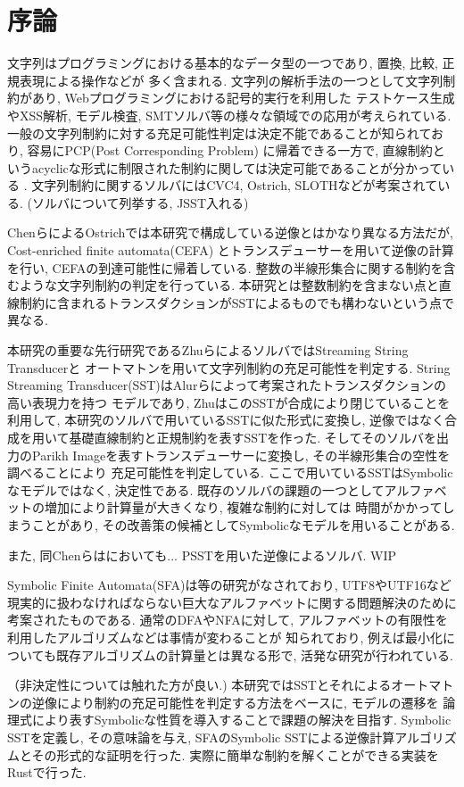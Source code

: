 \documentclass[uplatex,dvipdfmx,a4j]{jsreport}
\begin{document}
  \chapter{序論}  \label{chap:introduction}

  文字列はプログラミングにおける基本的なデータ型の一つであり, 置換, 比較, 正規表現による操作などが
  多く含まれる.
  文字列の解析手法の一つとして文字列制約があり, Webプログラミングにおける記号的実行を利用した
  テストケース生成やXSS解析, モデル検査, SMTソルバ等の様々な領域での応用が考えられている.
  一般の文字列制約に対する充足可能性判定は決定不能であることが知られており, 容易にPCP(Post Corresponding Problem)
  に帰着できる一方で, 直線制約というacyclicな形式に制限された制約に関しては決定可能であることが分かっている
  \cite{lin2016string}.
  文字列制約に関するソルバにはCVC4\cite{barrett2011cvc4},
  Ostrich\cite{chen2020decision}, SLOTH\cite{holik2017string}などが考案されている.
  (ソルバについて列挙する, JSST入れる)

  ChenらによるOstrichでは本研究で構成している逆像とはかなり異なる方法だが,
  Cost-enriched finite automata(CEFA)\cite{alur2013regular}
  とトランスデューサーを用いて逆像の計算を行い, CEFAの到達可能性に帰着している.
  整数の半線形集合に関する制約を含むような文字列制約の判定を行っている.
  本研究とは整数制約を含まない点と直線制約に含まれるトランスダクションがSSTによるものでも構わないという点で異なる.

  本研究の重要な先行研究であるZhuらによるソルバ\cite{zhu2019sstsolver}ではStreaming String Transducerと
  オートマトンを用いて文字列制約の充足可能性を判定する.
  String Streaming Transducer(SST)はAlurらによって考案されたトランスダクションの高い表現力を持つ
  モデルであり, ZhuはこのSSTが合成により閉じていることを利用して,
  本研究のソルバで用いているSSTに似た形式に変換し, 逆像ではなく合成を用いて基礎直線制約と正規制約を表すSSTを作った.
  そしてそのソルバを出力のParikh Imageを表すトランスデューサーに変換し, その半線形集合の空性を調べることにより
  充足可能性を判定している.
  ここで用いているSSTはSymbolicなモデルではなく, 決定性である.
  既存のソルバの課題の一つとしてアルファベットの増加により計算量が大きくなり, 複雑な制約に対しては
  時間がかかってしまうことがあり, その改善策の候補としてSymbolicなモデルを用いることがある.

  また, 同Chenらは\cite{chen2022solving}においても...
  PSSTを用いた逆像によるソルバ.
  WIP

  Symbolic Finite Automata(SFA)は\cite{d2017power}等の研究がなされており,
  UTF8やUTF16など現実的に扱わなければならない巨大なアルファベットに関する問題解決のために考案されたものである.
  通常のDFAやNFAに対して, アルファベットの有限性を利用したアルゴリズムなどは事情が変わることが
  知られており, 例えば最小化についても既存アルゴリズムの計算量とは異なる形で, 活発な研究が行われている.

  （非決定性については触れた方が良い.)
  本研究ではSSTとそれによるオートマトンの逆像により制約の充足可能性を判定する方法をベースに, モデルの遷移を
  論理式により表すSymbolicな性質を導入することで課題の解決を目指す.
  Symbolic SSTを定義し, その意味論を与え,
  SFAのSymbolic SSTによる逆像計算アルゴリズムとその形式的な証明を行った.
  実際に簡単な制約を解くことができる実装をRustで行った.
\end{document}
